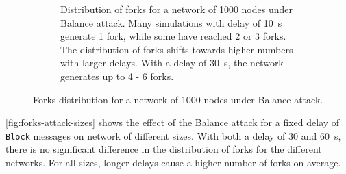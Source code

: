 \begin{figure}[ht]
\begin{subfigure}{\textwidth}
		\vspace*{0.25cm}
		\caption{
			Distribution of forks for a network of \num{1000} nodes under Balance attack.
			Many simulations with delay of \SI{10}{\second} generate \num{1} fork, while some have reached \num{2} or \num{3} forks.
			The distribution of forks shifts towards higher numbers with larger delays.
			With a delay of \SI{30}{\second}, the network generates up to \num{4} - \num{6} forks.
		}
		\vspace*{0.25cm}
	\end{subfigure}
	\caption[Forks distribution for a network of 1000 nodes under Balance attack]{
		Forks distribution for a network of \num{1000} nodes under Balance attack.
	}
	\label{fig:forks-attack-delay-1000}
\end{figure}

\medskip
\cref{fig:forks-attack-sizes} shows the effect of the Balance attack for a fixed delay of \texttt{Block} messages on network of different sizes.
With both a delay of \num{30} and \SI{60}{\second}, there is no significant difference in the distribution of forks for the different networks.
For all sizes, longer delays cause a higher number of forks on average.

